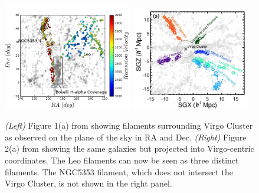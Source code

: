 \documentclass[11pt, preprint]{aastex}
\begin{document}
\begin{figure}[h]
\centering
\includegraphics[width=0.5\textwidth]{filaments.png}
\includegraphics[width=0.46\textwidth]{KimFig2a.png}
\caption{\small {\it (Left)} Figure 1(a) from \citet{kim16} showing filaments
  surrounding Virgo Cluster as observed on the plane of the sky in RA and Dec.  {\it (Right)} Figure
  2(a) from \citet{kim16} showing the same galaxies but projected into
Virgo-centric coordinates.  The Leo filaments can now be seen as three
distinct filaments.  The NGC5353 filament, which does not intersect
the Virgo Cluster, is not shown in the right panel.}
\label{kimfigure}
\end{figure}
\end{document}
